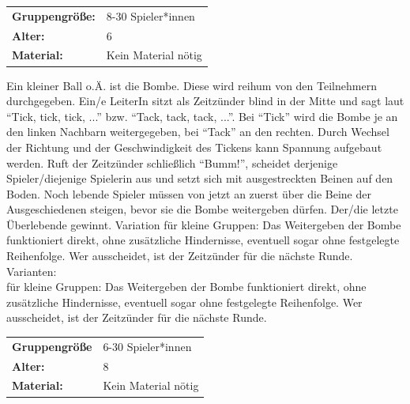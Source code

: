 \begin{table}[H]
\begin{tabular}{>{\bfseries}lp{8cm}}
   Gruppengröße:   & 8-30 Spieler*innen\\
    Alter: & 6 \\
    Material: & Kein Material nötig \\
\end{tabular}
\end{table} 

Ein kleiner Ball o.Ä. ist die Bombe. Diese wird reihum von den Teilnehmern durchgegeben. Ein/e LeiterIn sitzt als Zeitzünder blind in der Mitte und sagt laut “Tick, tick, tick, ...” bzw. “Tack, tack, tack, ...”. Bei “Tick” wird die Bombe je an den linken Nachbarn weitergegeben, bei “Tack” an den rechten. Durch Wechsel der Richtung und der Geschwindigkeit des Tickens kann Spannung aufgebaut werden. Ruft der Zeitzünder schließlich “Bumm!”, scheidet derjenige Spieler/diejenige Spielerin aus und setzt sich mit ausgestreckten Beinen auf den Boden. Noch lebende Spieler müssen von jetzt an zuerst über die Beine der Ausgeschiedenen steigen, bevor sie die Bombe weitergeben dürfen. Der/die letzte Überlebende gewinnt. Variation für kleine Gruppen: Das Weitergeben der Bombe funktioniert direkt, ohne zusätzliche Hindernisse, eventuell sogar ohne festgelegte Reihenfolge. Wer ausscheidet, ist der Zeitzünder für die nächste Runde.  \\ \newline
    Varianten: \\ für kleine Gruppen: Das Weitergeben der Bombe funktioniert direkt, ohne zusätzliche Hindernisse, eventuell sogar ohne festgelegte Reihenfolge. Wer ausscheidet, ist der Zeitzünder für die nächste Runde. \\



\begin{table}[H]
\begin{tabular}{>{\bfseries}lp{8cm}}
   Gruppengröße   & 6-30 Spieler*innen\\
    Alter: &  8\\
    Material: &Kein Material nötig \\
\end{tabular}
\end{table} 

